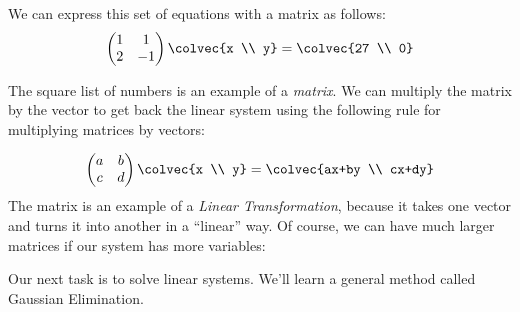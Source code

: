 We can express this set of equations with a matrix as follows:
\begin{equation*}
    \begin{pmatrix}
      1             &1  \\
      2             &-1
    \end{pmatrix}
  \colvec{x \\ y}
  =
  \colvec{27 \\ 0}
\end{equation*}

The square list of numbers is an example of a \emph{matrix}.  We can multiply the matrix by the vector to get back the linear system using the following rule for multiplying matrices by vectors:

\begin{equation}\label{2x2multiplication}
    \begin{pmatrix}
      a             &b  \\
      c             &d
    \end{pmatrix}
  \colvec{x \\ y}
  =
  \colvec{ax+by \\ cx+dy}
\end{equation}
\noindent
The matrix is an example of a \emph{Linear Transformation}, because it takes one vector and turns it into another in a ``linear'' way.
Of course, we can have much larger matrices if our system has more variables:



Our next task is to solve linear systems. We'll learn a general method called Gaussian Elimination.








\newpage
